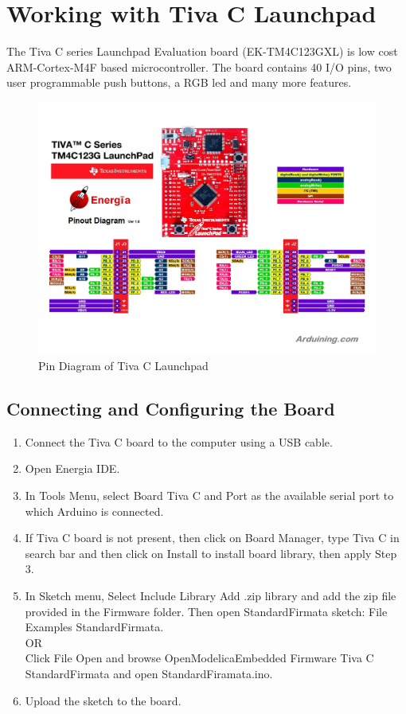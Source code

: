 \documentclass[12pt,a4paper]{report}
\begin{document}
\chapter{\textbf{Working with Tiva C Launchpad}}
The Tiva C series Launchpad Evaluation board (EK-TM4C123GXL) is low cost ARM-Cortex-M4F based microcontroller.	 The board contains 40 I/O pins, two user programmable push buttons, a RGB led and many more features.

\begin{figure}[H]
\centering
\includegraphics[width =\textwidth]{tiva_c_launchpad_pinout}
\caption{Pin Diagram of Tiva C Launchpad}
\label{figure:21}
\end{figure}

\section{Connecting and Configuring the Board}
\begin{enumerate}
\item Connect the Tiva C board to the computer using a USB cable.
\item Open Energia IDE.
\item In Tools Menu, select Board \textrightarrow Tiva C  and Port as the available serial port to which Arduino is connected.
\item If Tiva C board is not present, then click on Board Manager, type Tiva C in search bar and then click on Install to install board library, then apply Step 3.
\item In Sketch menu, Select Include Library \textrightarrow Add .zip library and add the zip file provided in the Firmware folder. Then open StandardFirmata sketch: File \textrightarrow Examples \textrightarrow StandardFirmata.\\
OR\\
Click File \textrightarrow Open and browse OpenModelicaEmbedded \textrightarrow Firmware \textrightarrow Tiva C \textrightarrow StandardFirmata and open StandardFiramata.ino.
\item Upload the sketch to the board.
\end{enumerate}
\end{document}
